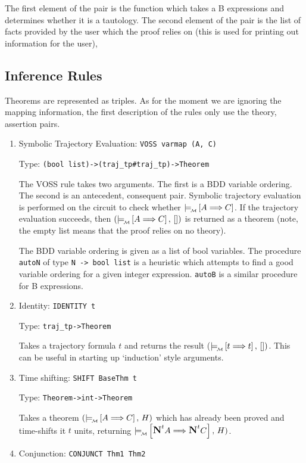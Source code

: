 The first element of the pair is the function which takes
a B expressions and determines whether it is a tautology.
The second element of the pair is the list of facts provided
by the user which the proof relies on (this is used for
printing out information for the user),


\subsection{Inference Rules}

\noindent
Theorems are  represented as triples. As for the moment
we are ignoring the mapping information, the first description
of the rules only use the theory, assertion pairs.


\begin{enumerate}

\item
Symbolic Trajectory Evaluation: {\tt VOSS varmap (A, C)}

Type: {\tt (bool list)->(traj\_tp\#traj\_tp)->Theorem}

The VOSS rule takes two arguments. The first is a BDD variable
ordering. The second is an antecedent, consequent pair. 
Symbolic trajectory evaluation is performed on the circuit
to check whether $\models_{\!{\mbox{}_{\cal M}}}\! \left[A\Longrightarrow C\right]$. If the trajectory evaluation
succeeds, then  $(\models_{\!{\mbox{}_{\cal M}}}\! \left[A\Longrightarrow C\right],\, [])$ is returned as a theorem
(note, the empty list means that the proof relies on no theory).

The BDD variable ordering is given as a list of bool variables.
The procedure {\tt autoN} of type {\tt N -> bool list} is a
heuristic which attempts to find a good variable ordering for
a given integer expression. {\tt autoB} is a similar procedure
for B expressions.

\item Identity: {\tt IDENTITY  t}

Type: {\tt traj\_tp->Theorem}

Takes a trajectory formula $t$ and returns the result
($\models_{\!{\mbox{}_{\cal M}}}\! \left[t\Longrightarrow t\right],\,[])$. This can be useful in starting up `induction'
style arguments.

\item Time shifting: {\tt SHIFT BaseThm  t}

Type: {\tt Theorem->int->Theorem}

Takes a theorem $(\models_{\!{\mbox{}_{\cal M}}}\! \left[A\Longrightarrow C\right],\, H)$ 
which has already been proved and time-shifts it
$t$ units, returning $\models_{\!{\mbox{}_{\cal M}}}\! \left[\mbox{\large\bf N}^tA\Longrightarrow \mbox{\large\bf N}^tC\right],\, H)$. 

\item Conjunction: {\tt CONJUNCT  Thm1 Thm2}


\end{enumerate}
